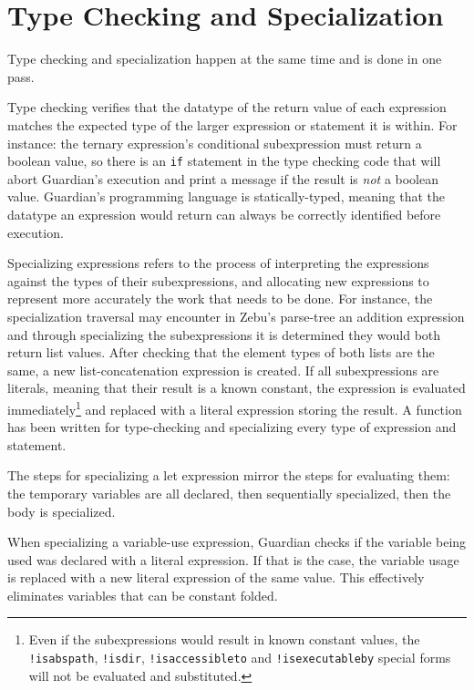 
\section{Type Checking and Specialization}
{
	Type checking and specialization happen at the same time and is done
	in one pass.
	
	Type checking verifies that the datatype of the return value of each
	expression matches the expected type of the larger
	expression or statement it is within. For instance: the ternary
	expression's conditional subexpression
	must return a boolean value, so there is an \texttt{if} statement in
	the type checking code that will
	abort Guardian's execution and print a message if the result
	is \textit{not} a boolean value.
	Guardian's programming language is statically-typed, meaning
	that the datatype an expression would return can always be correctly
	identified before execution.
	
	Specializing expressions refers to the process
	of interpreting the expressions
	against the types of their subexpressions, and allocating new expressions
	to represent more accurately the work that needs to be done.
	For instance, the specialization traversal may encounter in
	Zebu's parse-tree an addition expression and through specializing
	the subexpressions it is determined they would both return
	list values. After checking that the element types of both lists are the
	same, a new list-concatenation expression is created.
	If all subexpressions are literals, meaning that their result is a known
	constant, the expression is evaluated immediately\footnote{Even if
	the subexpressions would result in known constant values, the
	\texttt{!isabspath}, \texttt{!isdir}, \texttt{!isaccessibleto}
	and \texttt{!isexecutableby} special forms will not be evaluated and
	substituted.} and replaced with a literal expression storing the result.
	A function has been written for type-checking and specializing every
	type of expression and statement.
	
	The steps for specializing a let expression mirror the steps for
	evaluating them: the temporary variables are all declared, then sequentially
	specialized, then the body is specialized.
	
	When specializing a variable-use expression, Guardian checks if the
	variable being used was declared with a literal expression. If that
	is the case, the variable usage is replaced with a new literal expression
	of the same value. This effectively eliminates variables that can be
	constant folded. 
	
}
